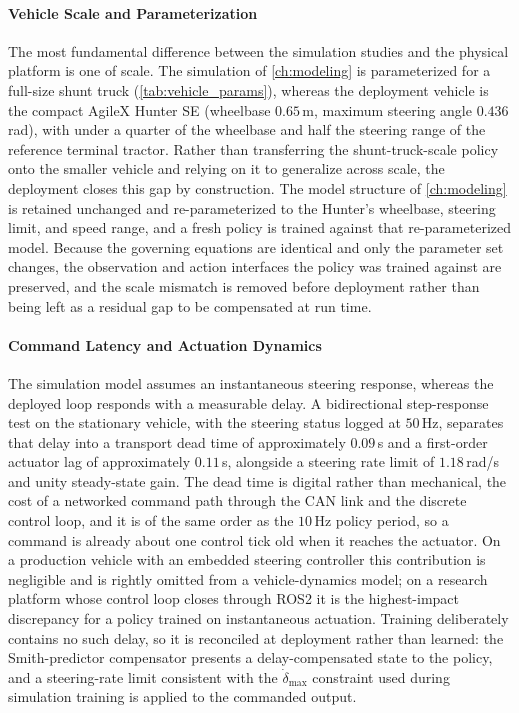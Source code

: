 \paragraph{Vehicle Scale and Parameterization}
\label{sec:gap_scale}

The most fundamental difference between the simulation studies and the physical platform is one of scale. The simulation of \cref{ch:modeling} is parameterized for a full-size shunt truck (\cref{tab:vehicle_params}), whereas the deployment vehicle is the compact AgileX Hunter SE (wheelbase $0.65$\,m, maximum steering angle $0.436$\,rad), with under a quarter of the wheelbase and half the steering range of the reference terminal tractor. Rather than transferring the shunt-truck-scale policy onto the smaller vehicle and relying on it to generalize across scale, the deployment closes this gap by construction. The model structure of \cref{ch:modeling} is retained unchanged and re-parameterized to the Hunter's wheelbase, steering limit, and speed range, and a fresh policy is trained against that re-parameterized model. Because the governing equations are identical and only the parameter set changes, the observation and action interfaces the policy was trained against are preserved, and the scale mismatch is removed before deployment rather than being left as a residual gap to be compensated at run time.

\paragraph{Command Latency and Actuation Dynamics}
\label{sec:gap_actuation}

The simulation model assumes an instantaneous steering response, whereas the deployed loop responds with a measurable delay. A bidirectional step-response test on the stationary vehicle, with the steering status logged at $50$\,Hz, separates that delay into a transport dead time of approximately $0.09$\,s and a first-order actuator lag of approximately $0.11$\,s, alongside a steering rate limit of $1.18$\,rad/s and unity steady-state gain. The dead time is digital rather than mechanical, the cost of a networked command path through the CAN link and the discrete control loop, and it is of the same order as the $10$\,Hz policy period, so a command is already about one control tick old when it reaches the actuator. On a production vehicle with an embedded steering controller this contribution is negligible and is rightly omitted from a vehicle-dynamics model; on a research platform whose control loop closes through ROS2 it is the highest-impact discrepancy for a policy trained on instantaneous actuation. Training deliberately contains no such delay, so it is reconciled at deployment rather than learned: the Smith-predictor compensator presents a delay-compensated state to the policy, and a steering-rate limit consistent with the $\dot{\delta}_\text{max}$ constraint used during simulation training is applied to the commanded output.

